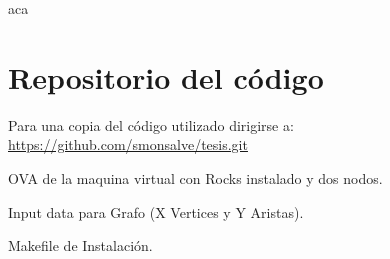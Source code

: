 \documentclass[twoside,letterpaper,12pt]{report}
\begin{document}
\newpage



	
aca
\cite{czarnecki2000generative}
\cite{wwwBoost}
\cite{stroustrup2013c++}
\cite{andrei2001modern}
\cite{Wall2000}
\cite{Boost}
\cite{Karniadakis}
\cite{Kernighan1988}


\newpage

\appendix
\chapter{Repositorio del código}

Para una copia del código utilizado dirigirse a: \url{https://github.com/smonsalve/tesis.git}

OVA de la maquina virtual con Rocks instalado y dos nodos.

Input data para Grafo (X Vertices y Y Aristas).

Makefile de Instalación.
\end{document}
